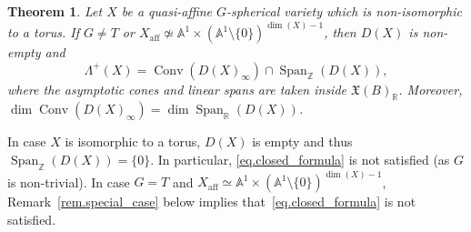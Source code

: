 \documentclass[11pt]{article}
\numberwithin{equation}{section}
\newcommand{\varocircle}{\bigcirc}
\theoremstyle{plain}
\newtheorem{theorem}{Theorem}[section]
\theoremstyle{definition}
\DeclareMathOperator{\aff}{aff}
\DeclareMathOperator{\Conv}{Conv}
\DeclareMathOperator{\Span}{Span}
\newcommand{\RR}{\mathbb{R}}
\newcommand{\ZZ}{\mathbb{Z}}
\renewcommand{\AA}{\mathbb{A}}
\begin{document}
\begin{theorem}
\label{thm.description_of_weight-monoid}
Let $X$ be a quasi-affine $G$-spherical variety which is non-isomorphic to a torus.
If $G \neq T$ or $X_{\aff} \not\simeq \AA^1 \times (\AA^1 \setminus \{0\})^{\dim(X)-1}$, then
$D(X)$ is non-empty and
\[
\label{eq.closed_formula}
\tag{$\varocircle$}
\Lambda^+(X) = \Conv ( D(X)_{\infty}) \cap \Span_{\ZZ}(D(X)),
\]
where the asymptotic cones and linear spans are taken inside $\mathfrak{X}(B)_{\RR}$.
Moreover, $\dim \Conv ( D(X)_{\infty}) = \dim \Span_{\RR}(D(X))$.
\end{theorem}

In case $X$ is isomorphic to a torus, $D(X)$ is empty and thus $\Span_{\ZZ}(D(X)) = \{0\}$.
In particular, \eqref{eq.closed_formula} is not satisfied (as $G$ is non-trivial).
In case $G = T$ and $X_{\aff} \simeq \AA^1 \times (\AA^1 \setminus \{0\})^{\dim(X)-1}$, Remark~\ref{rem.special_case} below implies that~\eqref{eq.closed_formula} is not satisfied.
\end{document}
